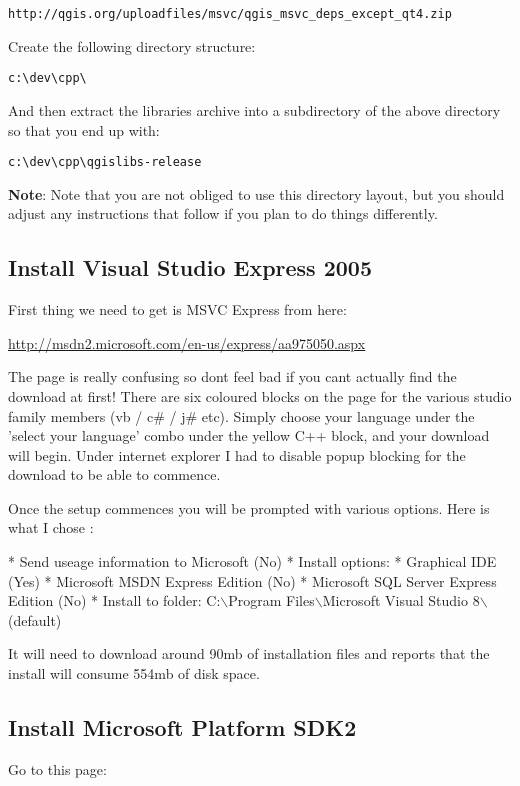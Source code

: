 \begin{verbatim}
http://qgis.org/uploadfiles/msvc/qgis_msvc_deps_except_qt4.zip
\end{verbatim}

Create the following directory structure:

\begin{verbatim}
c:\dev\cpp\
\end{verbatim}

And then extract the libraries archive into a subdirectory of the above
directory so that you end up with:

\begin{verbatim}
c:\dev\cpp\qgislibs-release
\end{verbatim}

\textbf{Note}:   Note that you are not obliged to use this directory layout, but you 
should adjust any instructions that follow if you plan to do things 
differently.

\subsection{Install Visual Studio Express 2005}
First thing we need to get is MSVC Express from here:

\url{http://msdn2.microsoft.com/en-us/express/aa975050.aspx}

The page is really confusing so dont feel bad if you cant actually find the 
download at first! There are six coloured blocks on the page for the various  
studio family members (vb / c\# / j\# etc). Simply choose your language under 
the 'select your language' combo under the yellow C++ block, and your download 
will begin. Under internet explorer I had to disable popup blocking for the 
download to be able to commence.

Once the setup commences you will be prompted with various options. Here is what 
I chose :

 * Send useage information to Microsoft   (No)
 * Install options:
   * Graphical IDE                        (Yes)
   * Microsoft MSDN Express Edition       (No)
   * Microsoft SQL Server Express Edition (No)
 * Install to folder: C:$\backslash$Program Files$\backslash$Microsoft Visual Studio 8$\backslash$   (default)

It will need to download around 90mb of installation files and reports 
that the install will consume 554mb of disk space.

\subsection{Install Microsoft Platform SDK2}
Go to this page:

